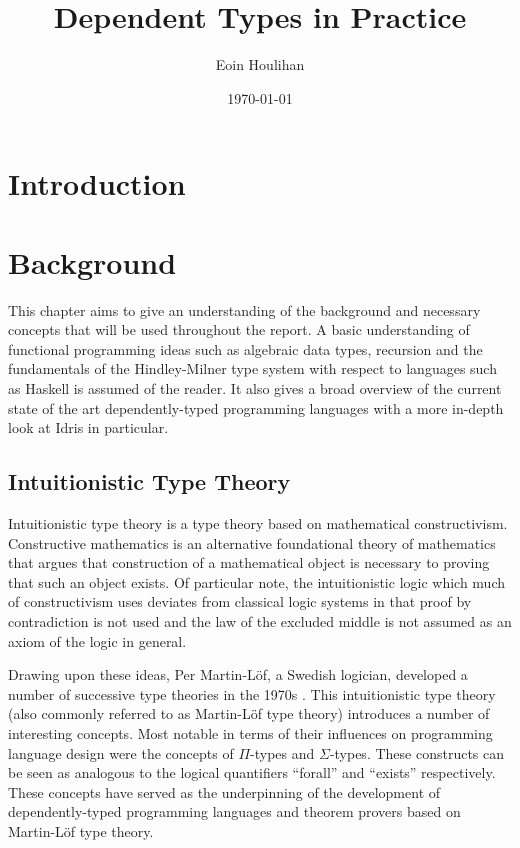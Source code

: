 \documentclass[a4paper, notitlepage]{report}
\author{Eoin Houlihan}
\date{\today}
\title{Dependent Types in Practice}
\begin{document}
\inserttitlepage
{}
\declaration
\permissiontolend
\insertabstract
\acknowledgements
\tableofcontents
\newpage
{}

\chapter{Introduction}
\label{sec:orga5c8034}
\chapter{Background}
\label{sec:org8fa174b}
This chapter aims to give an understanding of the background and necessary
concepts that will be used throughout the report. A basic understanding of
functional programming ideas such as algebraic data types, recursion and the
fundamentals of the Hindley-Milner type system with respect to languages such as
Haskell is assumed of the reader. It also gives a broad overview of the current
state of the art dependently-typed programming languages with a more in-depth
look at Idris in particular.

\section{Intuitionistic Type Theory}
\label{sec:org1f785c1}
Intuitionistic type theory is a type theory based on mathematical
constructivism. Constructive mathematics is an alternative foundational theory
of mathematics that argues that construction of a mathematical object is
necessary to proving that such an object exists. Of particular note, the
intuitionistic logic which much of constructivism uses deviates from classical
logic systems in that proof by contradiction is not used and the law of the
excluded middle is not assumed as an axiom of the logic in general.

Drawing upon these ideas, Per Martin-Löf, a Swedish logician, developed a number
of successive type theories in the 1970s \cite{martin-lof_intuitionistic_1984}.
This intuitionistic type theory (also commonly referred to as Martin-Löf type
theory) introduces a number of interesting concepts. Most notable in terms of
their influences on programming language design were the concepts of \(\Pi\)-types
and \(\Sigma\)-types. These constructs can be seen as analogous to the logical
quantifiers ``forall'' and ``exists'' respectively. These concepts have served
as the underpinning of the development of dependently-typed programming
languages and theorem provers based on Martin-Löf type theory.
\end{document}
